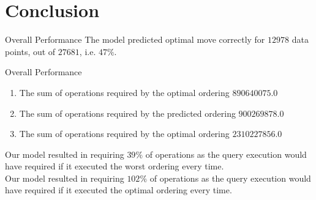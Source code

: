 \section{Conclusion}
\frame{\sectionpage}

\begin{frame}{Overall Performance}
    The model predicted optimal move correctly for $12978$ data points, out of $27681$, i.e. $47\%$.\\
\end{frame}

\begin{frame}{Overall Performance}
    \begin{enumerate}
        \item The sum of operations required by the optimal ordering $890640075.0$
        \item The sum of operations required by the predicted ordering $900269878.0$
        \item The sum of operations required by the optimal ordering $2310227856.0$
    \end{enumerate}
\end{frame}

\begin{frame}
    Our model resulted in requiring $39\%$ of operations as the query execution would have required if it executed the worst ordering every time.\\
    Our model resulted in requiring $102\%$ of operations as the query execution would have required if it executed the optimal ordering every time.\\
\end{frame}



